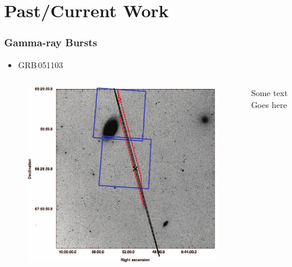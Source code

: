 \documentclass{beamer}
\begin{document}
\section{Past/Current Work}

\begin{frame}
    \tableofcontents[currentsection]
\end{frame}

\begin{frame}
    \frametitle{Gamma-ray Bursts}
    \begin{itemize}
        \item GRB\,051103~\cite{2012arXiv1201.4413T}
    \end{itemize}

    \begin{columns}[]
        \begin{center}
        \begin{figure}
            \vspace*{-0.5cm}
            \includegraphics[scale=0.6]{m81_from_Hurley10.pdf} 
        \end{figure}
        \end{center}

        \begin{block}{Some text}
            Goes here
        \end{block}
    \end{columns}
\end{frame}
\end{document}
